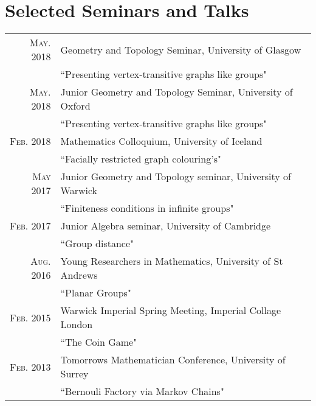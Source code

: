 \documentclass[a4paper,10pt]{article}
\begin{document}
\section{Selected Seminars and Talks}
\begin{tabular}{rl}
\textsc{May.} 2018 & Geometry and Topology Seminar, University of Glasgow\\
& ``Presenting vertex-transitive graphs like groups"\\
\textsc{May.} 2018 & Junior Geometry and Topology Seminar, University of Oxford\\
& ``Presenting vertex-transitive graphs like groups"\\
\textsc{Feb.} 2018 & Mathematics Colloquium, University of Iceland\\
& ``Facially restricted graph colouring's"\\
\textsc{May} 2017 & Junior Geometry and Topology seminar, University of Warwick\\
& ``Finiteness conditions in infinite groups"\\
\textsc{Feb.} 2017 & Junior Algebra seminar, University of Cambridge\\
& ``Group distance"\\
\textsc{Aug.} 2016 & Young Researchers in Mathematics, University of St Andrews\\
& ``Planar Groups"\\
\textsc{Feb.} 2015 &  Warwick Imperial Spring Meeting, Imperial Collage London\\
& ``The Coin Game"\\
\textsc{Feb.} 2013 & Tomorrows Mathematician Conference, University of Surrey\\
& ``Bernouli Factory via Markov Chains"\\
\end{tabular}
\end{document}
